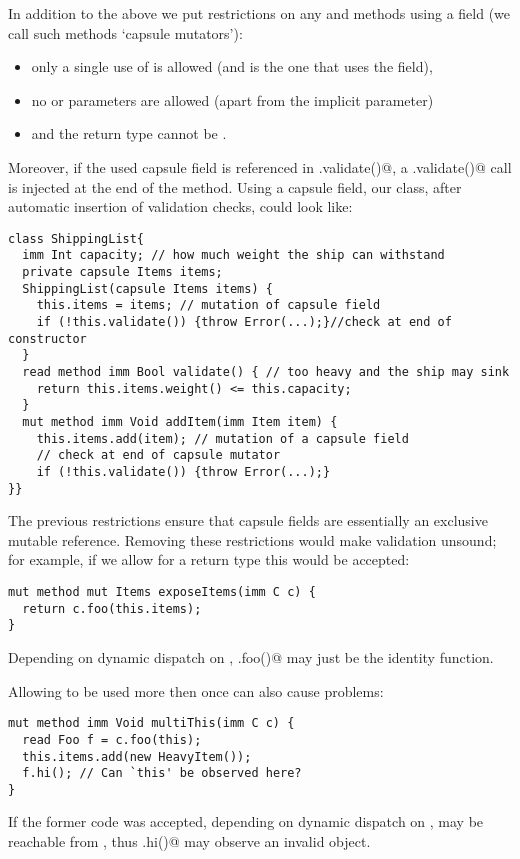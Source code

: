 In addition to the above we put restrictions on any \Q@mut@ and \Q@capsule@ methods using a \Q@capsule@ field (we call such methods `capsule mutators'):
\begin{itemize}
\item only a single use of \Q@this@ is allowed (and is the one that uses the field),
\item no \Q@mut@ or \Q@read@ parameters are allowed (apart from the implicit \Q@this@ parameter)
\item and the return type cannot be \Q@mut@.
\end{itemize}
\noindent  Moreover, if the used capsule field is referenced in \Q@.validate()@, a \Q@this.validate()@ call is injected at the end of the method.
Using a capsule field, our \Q@ShippingList@ class, after automatic insertion of validation checks, could look like:
\saveSpace
\begin{lstlisting}
class ShippingList{
  imm Int capacity; // how much weight the ship can withstand
  private capsule Items items;
  ShippingList(capsule Items items) {
    this.items = items; // mutation of capsule field
    if (!this.validate()) {throw Error(...);}//check at end of constructor
  }
  read method imm Bool validate() {	// too heavy and the ship may sink
    return this.items.weight() <= this.capacity;
  }
  mut method imm Void addItem(imm Item item) {
    this.items.add(item); // mutation of a capsule field
    // check at end of capsule mutator
    if (!this.validate()) {throw Error(...);}
}}
\end{lstlisting}
\saveSpace

\noindent The previous restrictions ensure that capsule fields are essentially an exclusive mutable reference.
Removing these restrictions would make validation unsound; for example, if we allow for a \Q@mut@ return type this would be accepted:

\saveSpace
\begin{lstlisting}
mut method mut Items exposeItems(imm C c) {
  return c.foo(this.items);
}
\end{lstlisting}
\saveSpace
\noindent Depending on dynamic dispatch on \Q@c@, \Q@c.foo()@ may just be the identity function.

Allowing \Q@this@ to be used more then once can also cause problems:
\saveSpace
\begin{lstlisting}
mut method imm Void multiThis(imm C c) {
  read Foo f = c.foo(this);
  this.items.add(new HeavyItem());
  f.hi(); // Can `this' be observed here?
}
\end{lstlisting}
\saveSpace
\noindent If the former code was accepted, depending on dynamic dispatch on \Q@c@,
\Q@this@ may be reachable from \Q@f@, thus \Q@f.hi()@ may observe an invalid object.

